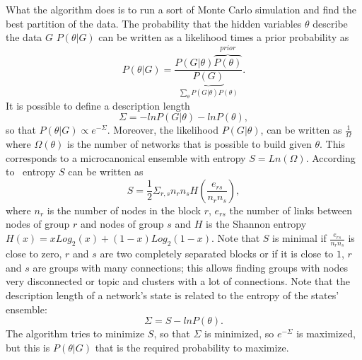 What the algorithm does is to run a sort of Monte Carlo simulation and find the best partition of the data.
The probability that the hidden variables $\theta$ describe the data $G$ $P(\theta | G)$ can be written as a likelihood times a prior probability as
\[P(\theta|G)=\frac{P(G|\theta)\overbrace{P(\theta)}^{prior}}{\underbrace{P(G)}_{\sum_{\theta}P(G|\theta)P(\theta)}}.\]
It is possible to define a description length
\[
\Sigma=-lnP(G|\theta)-lnP(\theta),
\]
so that $P(\theta | G)\propto e^{-\Sigma}$.
Moreover, the likelihood $P(G | \theta)$, can be written as $\frac{1}{\Omega}$ where $\Omega(\theta)$ is the number of networks that is possible to build given $\theta$. This corresponds to a microcanonical ensemble with entropy $S=Ln\left(\Omega\right)$. According to~\cite{peixoto2017nonparametric} entropy $S$ can be written as
\[
S=\frac{1}{2}\Sigma_{r,s} n_r n_s H\left(\frac{e_{rs}}{n_rn_s}\right),
\]
where $n_r$ is the number of nodes in the block $r$, $e_{rs}$ the number of links between nodes of group $r$ and nodes of group $s$ and $H$ is the Shannon entropy $H(x)=xLog_2(x)+(1-x)Log_2(1-x)$. Note that $S$ is minimal if $\frac{e_{rs}}{n_rn_s}$ is close to zero, $r$ and $s$ are two completely separated blocks or if it is close to $1$, $r$ and $s$ are groups with many connections; this allows finding groups with nodes very disconnected or topic and clusters with a lot of connections. Note that the description length of a network's state is related to the entropy of the states' ensemble:
\[
\Sigma=S-lnP(\theta).
\]
The algorithm tries to minimize $S$, so that $\Sigma$ is minimized, so $e^{-\Sigma}$ is maximized, but this is $P(\theta | G)$ that is the required probability to maximize.

